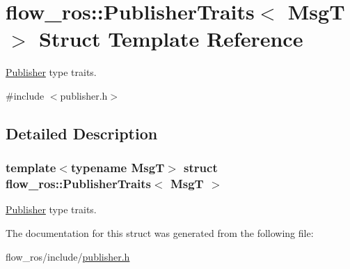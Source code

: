 \hypertarget{structflow__ros_1_1_publisher_traits}{}\section{flow\+\_\+ros\+:\+:Publisher\+Traits$<$ MsgT $>$ Struct Template Reference}
\label{structflow__ros_1_1_publisher_traits}


\hyperlink{classflow__ros_1_1_publisher}{Publisher} type traits.  




{\ttfamily \#include $<$publisher.\+h$>$}



\subsection{Detailed Description}
\subsubsection*{template$<$typename MsgT$>$\newline
struct flow\+\_\+ros\+::\+Publisher\+Traits$<$ Msg\+T $>$}

\hyperlink{classflow__ros_1_1_publisher}{Publisher} type traits. 

The documentation for this struct was generated from the following file\+:\begin{DoxyCompactItemize}
\item 
flow\+\_\+ros/include/\hyperlink{publisher_8h}{publisher.\+h}\end{DoxyCompactItemize}
